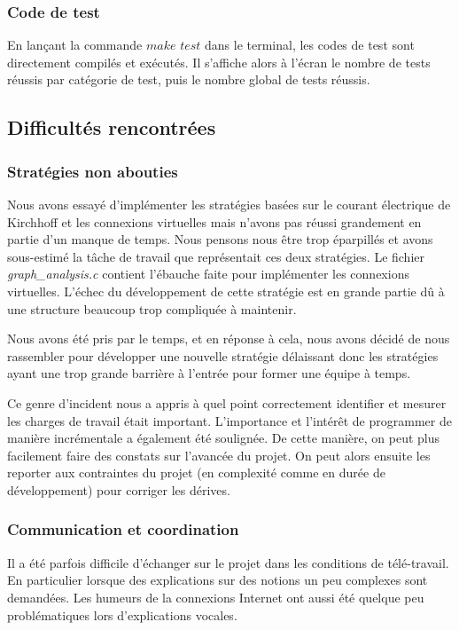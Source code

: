 \documentclass{article}
\begin{document}
\subsubsection{Code de test}
En lançant la commande $make$ $test$ dans le terminal, les codes de test sont directement compilés et exécutés. Il s'affiche alors à l'écran le nombre de tests réussis par catégorie de test, puis le nombre global de tests réussis.

\subsection{Difficultés rencontrées}

\subsubsection{Stratégies non abouties}

Nous avons essayé d'implémenter les stratégies basées sur le courant électrique de Kirchhoff et les connexions virtuelles mais n'avons pas réussi grandement en partie d'un manque de temps. Nous pensons nous être trop éparpillés et avons sous-estimé la tâche de travail que représentait ces deux stratégies. Le fichier \textit{graph\_analysis.c} contient l'ébauche faite pour implémenter les connexions virtuelles. L'échec du développement de cette stratégie est en grande partie dû à une structure beaucoup trop compliquée à maintenir.

Nous avons été pris par le temps, et en réponse à cela, nous avons décidé de nous rassembler pour développer une nouvelle stratégie délaissant donc les stratégies ayant une trop grande barrière à l'entrée pour former une équipe à temps.

Ce genre d'incident nous a appris à quel point correctement identifier et mesurer les charges de travail était important. L'importance et l'intérêt de programmer de manière incrémentale a également été soulignée. De cette manière, on peut plus facilement faire des constats sur l'avancée du projet. On peut alors ensuite les reporter aux contraintes du projet (en complexité comme en durée de développement) pour corriger les dérives.

\subsubsection{Communication et coordination}
Il a été parfois difficile d'échanger sur le projet dans les conditions de télé-travail. En particulier lorsque des explications sur des notions un peu complexes sont demandées. Les humeurs de la connexions Internet ont aussi été quelque peu problématiques lors d'explications vocales.
\end{document}

